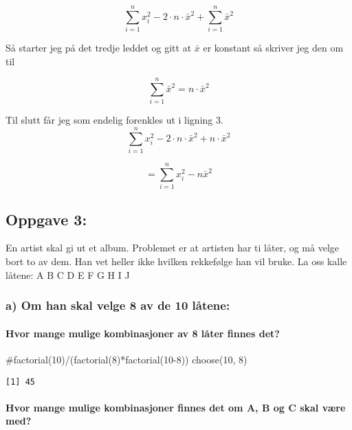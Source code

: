 \documentclass[
  12pt,
  a4paper,
  DIV=11,
  numbers=noendperiod]{scrartcl}
\let\oldparagraph\paragraph
\renewcommand{\paragraph}[1]{\oldparagraph{#1}\mbox{}}
\newenvironment{Shaded}{\begin{snugshade}}{\end{snugshade}}
\newcommand{\CommentTok}[1]{\textcolor[rgb]{0.37,0.37,0.37}{#1}}
\newcommand{\DecValTok}[1]{\textcolor[rgb]{0.68,0.00,0.00}{#1}}
\newcommand{\FunctionTok}[1]{\textcolor[rgb]{0.28,0.35,0.67}{#1}}
\newcommand{\NormalTok}[1]{\textcolor[rgb]{0.00,0.23,0.31}{#1}}
\begin{document}
\[\sum_{i=1}^{n} x_i^2 -2 \cdot n \cdot \bar x^2 + \sum_{i=1}^{n} \bar x^2\]

Så starter jeg på det tredje leddet og gitt at \(\bar x\) er konstant så
skriver jeg den om til

\[\sum_{i=1}^{n} \bar x^2 = n \cdot \bar x^2\]

Til slutt får jeg som endelig forenkles ut i ligning 3.
\[\sum_{i=1}^{n} x_i^2 -2 \cdot n \cdot \bar x^2 + n \cdot \bar x^2\]

\[= \sum_{i=1}^{n} x_i^2 - n\bar x^2 \tag{3}\]

\subsection{Oppgave 3:}\label{oppgave-3}

En artist skal gi ut et album. Problemet er at artisten har ti låter, og
må velge bort to av dem. Han vet heller ikke hvilken rekkefølge han vil
bruke. La oss kalle låtene: A B C D E F G H I J

\subsubsection{a) Om han skal velge 8 av de 10
låtene:}\label{a-om-han-skal-velge-8-av-de-10-luxe5tene}

\paragraph{Hvor mange mulige kombinasjoner av 8 låter finnes
det?}\label{hvor-mange-mulige-kombinasjoner-av-8-luxe5ter-finnes-det}

\begin{Shaded}
\begin{Highlighting}[]
\CommentTok{\#factorial(10)/(factorial(8)*factorial(10{-}8))}
\FunctionTok{choose}\NormalTok{(}\DecValTok{10}\NormalTok{, }\DecValTok{8}\NormalTok{)}
\end{Highlighting}
\end{Shaded}

\begin{verbatim}
[1] 45
\end{verbatim}

\paragraph{Hvor mange mulige kombinasjoner finnes det om A, B og C skal
være
med?}\label{hvor-mange-mulige-kombinasjoner-finnes-det-om-a-b-og-c-skal-vuxe6re-med}
\end{document}
